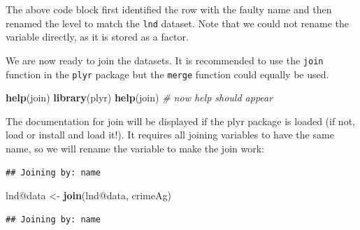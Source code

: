 \documentclass[]{article}
\newenvironment{Shaded}{}{}
\newcommand{\KeywordTok}[1]{\textcolor[rgb]{0.00,0.44,0.13}{\textbf{{#1}}}}
\newcommand{\DataTypeTok}[1]{\textcolor[rgb]{0.56,0.13,0.00}{{#1}}}
\newcommand{\DecValTok}[1]{\textcolor[rgb]{0.25,0.63,0.44}{{#1}}}
\newcommand{\StringTok}[1]{\textcolor[rgb]{0.25,0.44,0.63}{{#1}}}
\newcommand{\CommentTok}[1]{\textcolor[rgb]{0.38,0.63,0.69}{\textit{{#1}}}}
\newcommand{\NormalTok}[1]{{#1}}
\begin{document}
\begin{Shaded}
\end{Shaded}
The above code block first identified the row with the faulty name and
then renamed the level to match the \texttt{lnd} dataset. Note that we
could not rename the variable directly, as it is stored as a factor.

We are now ready to join the datasets. It is recommended to use the
\texttt{join} function in the \texttt{plyr} package but the
\texttt{merge} function could equally be used.

\begin{Shaded}
\begin{Highlighting}[]
\KeywordTok{help}\NormalTok{(join)}
\KeywordTok{library}\NormalTok{(plyr)}
\KeywordTok{help}\NormalTok{(join)  }\CommentTok{# now help should appear}
\end{Highlighting}
\end{Shaded}
The documentation for join will be displayed if the plyr package is
loaded (if not, load or install and load it!). It requires all joining
variables to have the same name, so we will rename the variable to make
the join work:

\begin{Shaded}
\end{Shaded}
\begin{verbatim}
## Joining by: name
\end{verbatim}
\begin{Shaded}
\begin{Highlighting}[]
\NormalTok{lnd@data <- }\KeywordTok{join}\NormalTok{(lnd@data, crimeAg)}
\end{Highlighting}
\end{Shaded}
\begin{verbatim}
## Joining by: name
\end{verbatim}
\end{document}
